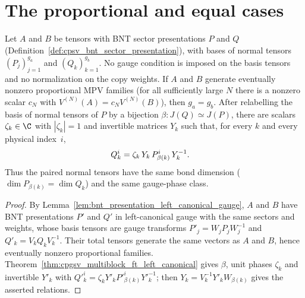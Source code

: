 \section{The proportional and equal cases}
\label{sec:ft_equal_proportional_cases}

\begin{theorem}%
    \label{thm:cpgsv_multiblock_ft_source}
    \leanok
    Let $A$ and $B$ be tensors with BNT sector presentations $P$ and $Q$
    (Definition~\ref{def:cpsv_bnt_sector_presentation}), with bases of normal
    tensors $(P_j)_{j=1}^{g_a}$ and $(Q_k)_{k=1}^{g_b}$. No gauge condition is
    imposed on the basis tensors and no normalization on the copy weights. If
    $A$ and $B$ generate eventually nonzero proportional MPV families (for all
    sufficiently large $N$ there is a nonzero scalar $c_N$ with
    $V^{(N)}(A)=c_NV^{(N)}(B)$), then $g_a=g_b$. After relabelling the basis of
    normal tensors of $P$ by a bijection $\beta:J(Q)\simeq J(P)$, there are
    scalars $\zeta_k\in\C$ with $|\zeta_k|=1$ and invertible matrices $Y_k$
    such that, for every $k$ and every physical index~$i$,
    \begin{align}
        Q_k^i
         & =\zeta_k\,Y_k\,P_{\beta(k)}^i\,Y_k^{-1}. \notag
    \end{align}
    Thus the paired normal tensors have the same bond dimension
    ($\dim P_{\beta(k)}=\dim Q_k$) and the same gauge-phase class.
\end{theorem}

\begin{proof}\leanok
    By Lemma~\ref{lem:bnt_presentation_left_canonical_gauge}, $A$ and $B$
    have BNT presentations $P'$ and $Q'$ in left-canonical gauge with the same
    sectors and weights, whose basis tensors are gauge transforms
    $P'_j=W_jP_jW_j^{-1}$ and $Q'_k=V_kQ_kV_k^{-1}$. Their total tensors
    generate the same vectors as $A$ and $B$, hence eventually nonzero
    proportional families. Theorem~\ref{thm:cpgsv_multiblock_ft_left_canonical}
    gives $\beta$, unit phases $\zeta_k$ and invertible $Y'_k$ with
    $Q'^i_k=\zeta_kY'_kP'^i_{\beta(k)}Y'^{-1}_k$; then
    $Y_k=V_k^{-1}Y'_kW_{\beta(k)}$ gives the asserted relations.
\end{proof}

